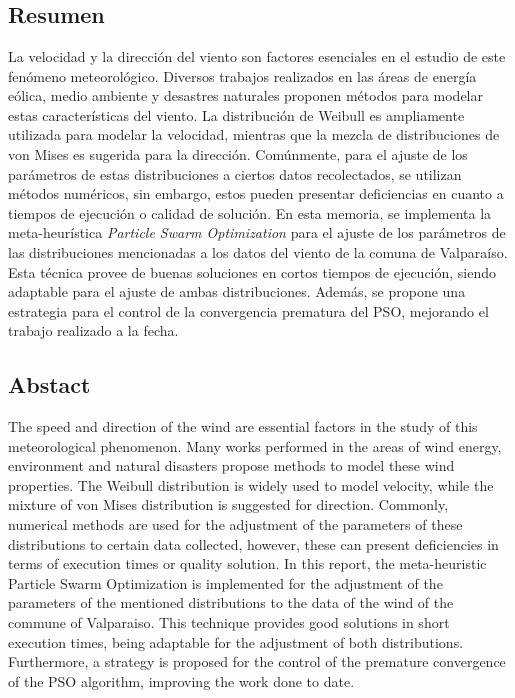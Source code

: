 \documentclass[12pt, letterpaper, oneside]{book}
\begin{document}
\frontmatter
\thispagestyle{empty}

\newpage
\chapter*{ }
\vspace{-3cm}
\newpage


\chapter*{ }
\vspace{-3cm}
\section*{Resumen}
La velocidad y la dirección del viento son factores esenciales en el estudio de este fenómeno meteorológico. Diversos trabajos realizados en las áreas de energía eólica, medio ambiente y desastres naturales proponen métodos para modelar estas características del viento. La distribución de Weibull es ampliamente utilizada para modelar la velocidad, mientras que la mezcla de distribuciones de von Mises es sugerida para la dirección. Comúnmente, para el ajuste de los parámetros de estas distribuciones a ciertos datos recolectados, se utilizan métodos numéricos, sin embargo, estos pueden presentar deficiencias en cuanto a tiempos de ejecución o calidad de solución. En esta memoria, se implementa la meta-heurística \emph{Particle Swarm Optimization} para el ajuste de los parámetros de las distribuciones mencionadas a los datos del viento de la comuna de Valparaíso. Esta técnica provee de buenas soluciones en cortos tiempos de ejecución, siendo adaptable para el ajuste de ambas distribuciones. Además, se propone una estrategia para el control de la convergencia prematura del PSO, mejorando el trabajo realizado a la fecha.
\section*{Abstact}
The speed and direction of the wind are essential factors in the study of this meteorological phenomenon. Many works performed in the areas of wind energy, environment and natural disasters propose methods to model these wind properties. The Weibull distribution is widely used to model velocity, while the mixture of von Mises distribution is suggested for direction. Commonly, numerical methods are used for the adjustment of the parameters of these distributions to certain data collected, however, these can present deficiencies in terms of execution times or quality solution. In this report, the meta-heuristic Particle Swarm Optimization is implemented for the adjustment of the parameters of the mentioned distributions to the data of the wind of the commune of Valparaiso. This technique provides good solutions in short execution times, being adaptable for the adjustment of both distributions. Furthermore, a strategy is proposed for the control of the premature convergence of the PSO algorithm, improving the work done to date.
\newpage
\end{document}

